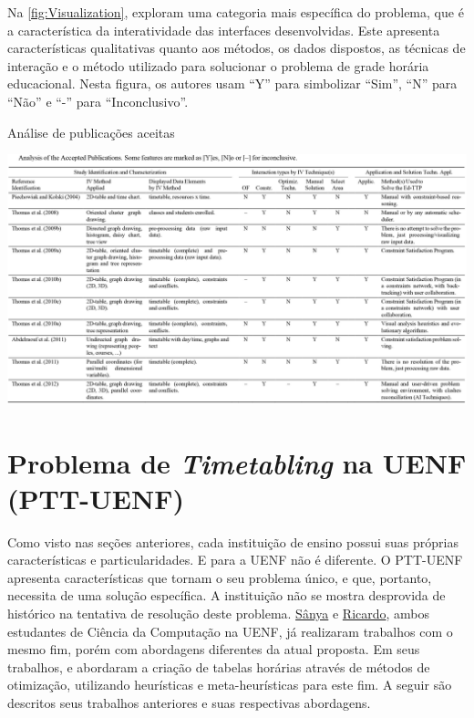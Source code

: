 Na \autoref{fig:Visualization},  exploram uma categoria mais específica do problema, que é a característica da interatividade das interfaces desenvolvidas. Este apresenta características qualitativas quanto aos métodos, os dados dispostos, as técnicas de interação e o método utilizado para solucionar o problema de grade horária educacional. Nesta figura, os autores usam ``Y'' para simbolizar ``Sim'', ``N'' para ``Não'' e ``-'' para ``Inconclusivo''.

\begin{CenteredFigure} \caption{Análise de publicações aceitas} \label{fig:Visualization}
  \includegraphics[width=\textwidth]{files/img/2.02!2-marco/Visualization}
\end{CenteredFigure}    %

\section{Problema de \textit{Timetabling} na UENF (PTT-UENF)} \label{sec:anteriores}                               %

Como visto nas seções anteriores, cada instituição de ensino possui suas próprias características e particularidades. E para a UENF não é diferente. O PTT-UENF apresenta características que tornam o seu problema único, e que, portanto, necessita de uma solução específica. A instituição não se mostra desprovida de histórico na tentativa de resolução deste problema. \hyperref[ssec:sanya]{Sânya} e \hyperref[ssec:ricardo]{Ricardo}, ambos estudantes de Ciência da Computação na UENF, já realizaram trabalhos com o mesmo fim, porém com abordagens diferentes da atual proposta. Em seus trabalhos,  e  abordaram a criação de tabelas horárias através de métodos de otimização, utilizando heurísticas e meta-heurísticas para este fim. A seguir são descritos seus trabalhos anteriores e suas respectivas abordagens.

